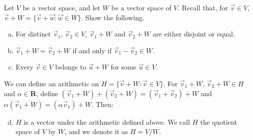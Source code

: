 \documentclass[a4paper,11pt]{article}
\newcommand{\R}{\mathbf{R}}
\begin{document}
 Let $V$ be a vector space, and let $W$ be a
vector space of $V$. Recall that, for $\vec v \in V$, $\vec v + W = \{\vec
v+\vec w : \vec w \in W\}$. Show the following.
\begin{enumerate}[(a)]
\item For distinct $\vec v_1,\,\vec v_2 \in V$, $\vec v_1+W$ and $\vec v_2+W$
  are either disjoint or equal.
\item $\vec v_1+W = \vec v_2+W$ if and only if $\vec v_1 - \vec v_2 \in W$.
\item Every $\vec v \in V$ belongs to $\vec u+W$ for some $\vec u \in V$.
\end{enumerate}
We can define an arithmetic on $H = \{\vec v+W : \vec v \in V\}$. For $\vec
v_1+W,\,\vec v_2+W \in H$ and $\alpha \in \R$, define $(\vec v_1+W)+(\vec v_2+W)
= (\vec v_1+\vec v_2)+W$ and $\alpha(\vec v_1 + W) = (\alpha\vec v_1)+W$. Then:
\begin{enumerate}[(a)]
  \setcounter{enumi}{3}
\item $H$ is a vector under the arithmetic defined above. We call $H$ the
  quotient space of $V$ by $W$, and we denote it as $H = V/W$.
\end{enumerate}
\end{document}
